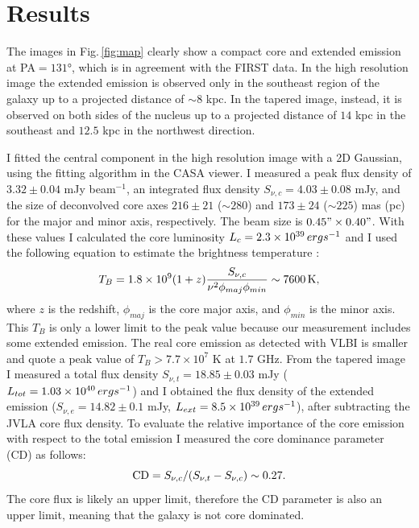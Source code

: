 \documentclass[../thesis.tex]{subfiles}
\begin{document}
\section{Results}
\label{sec:results}


The images in Fig.\,\ref{fig:map} clearly show a compact core and extended emission at PA$=\ang{131}$, which is in agreement with the FIRST data.
In the high resolution image the extended emission is observed only in the southeast region of the galaxy up to a projected distance of $\sim 8$ kpc.
In the tapered image, instead, it is observed on both sides of the nucleus up to a projected distance of $14$ kpc in the southeast and $12.5$ kpc in the northwest direction. 

I fitted the central component in the high resolution image with a 2D Gaussian, using the fitting algorithm in the CASA viewer.
I measured a peak flux density of $3.32\pm0.04$ mJy beam$^{-1}$, an integrated flux density $S_{\nu,c}=4.03\pm0.08$ mJy, and the size of deconvolved core axes $216\pm21$ ($\sim 280$) and $173\pm24$ ($\sim225$) mas (pc) for the major and minor axis, respectively.
The beam size is $0.45"\times0.40"$. 
With these values I calculated the core luminosity $L_{c}=2.3\times 10^{39}\,erg s^{-1}$ and I used the following equation to estimate the brightness temperature \citep{Doi13}: 
\begin{equation}
\label{eq:Tb}
T_B=1.8\times 10^9 (1+z)\frac{S_{\nu,c}}{\nu^2\phi_{maj}\phi_{min}}\sim7600 {\rm\, K},
\end{equation}
where $z$ is the redshift, $\phi_{maj}$ is the core major axis, and $\phi_{min}$ is the minor axis.
This $T_B$ is only a lower limit to the peak value because our measurement includes some extended emission.
The real core emission as detected with VLBI is smaller and \citet{Doi13} quote a peak value of $T_B>7.7\times 10^7$ K at $1.7$ GHz.
From the tapered image I measured a total flux density $S_{\nu,t} = 18.85 \pm 0.03$ mJy ($L_{tot}=1.03\times10^{40}\,erg s^{-1}$) and I obtained the flux density of the extended emission ($S_{\nu,e} = 14.82\pm0.1$ mJy, $L_{ext}=8.5\times10^{39}\,erg s^{-1}$), after subtracting the JVLA core flux density.
To evaluate the relative importance of the core emission with respect to the total emission I measured the core dominance parameter (CD) as follows:
\begin{equation}
\label{eq:cd}
{\rm CD}=S_{\nu,c}/(S_{\nu,t}-S_{\nu,c})\sim0.27.
\end{equation}
The core flux is likely an upper limit, therefore the CD parameter is also an upper limit, meaning that the galaxy is not core dominated.
\end{document}
